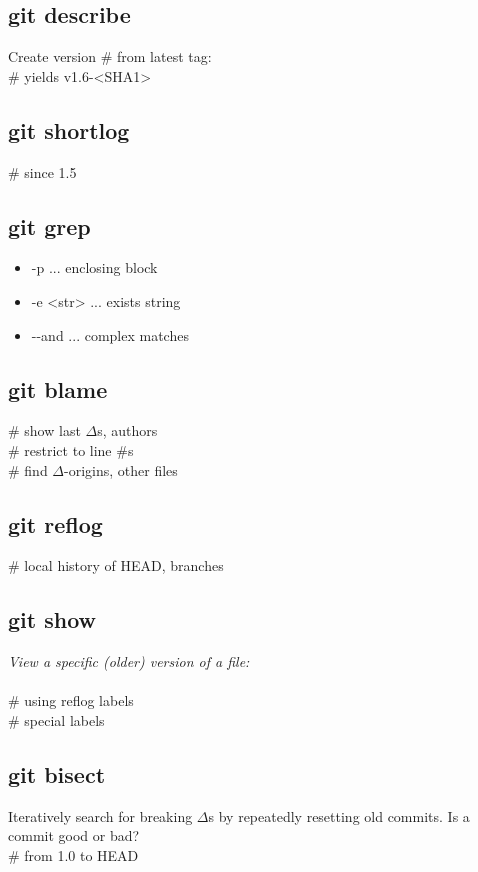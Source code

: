 \subsection*{git describe}
Create version \# from latest tag:\\
 \# yields v1.6-<SHA1>

\subsection*{git shortlog}
 \# since 1.5

\subsection*{git grep}
\begin{itemize}
    \item -p ... enclosing block
    \item -e <str> ... exists string
    \item -{}-and ... complex matches
\end{itemize}

\subsection*{git blame}
 \# show last $\Delta$s, authors\\
 \# restrict to line \#s\\
 \# find $\Delta$-origins, other files


\subsection*{git reflog}
 \# local history of HEAD, branches 


\subsection*{git show}
\textit{View a specific (older) version of a file:}\\
\\
 \# using reflog labels \\
 \# special labels 


\subsection*{git bisect}
Iteratively search for breaking $\Delta$s by repeatedly resetting old commits. Is a commit good or bad?\\
 \# from 1.0 to HEAD


